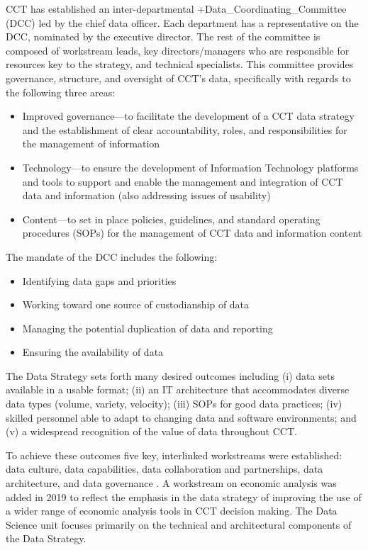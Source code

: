 \documentclass[
]{WileySix}
\providecommand{\tightlist}{%
  \setlength{\itemsep}{0pt}\setlength{\parskip}{0pt}}
\begin{document}
CCT has established an inter-departmental +Data\_Coordinating\_Committee\textbar{} (DCC) led by the chief data officer. Each department has a representative on the DCC, nominated by the executive director. The rest of the committee is composed of workstream leads, key directors/managers who are responsible for resources key to the strategy, and technical specialists. This committee provides governance, structure, and oversight of CCT's data, specifically with regards to the following three areas:

\begin{itemize}
\tightlist
\item
  Improved governance---to facilitate the development of a CCT data strategy and the establishment of clear accountability, roles, and responsibilities for the management of information
\item
  Technology---to ensure the development of Information Technology platforms and tools to support and enable the management and integration of CCT data and information (also addressing issues of usability)
\item
  Content---to set in place policies, guidelines, and standard operating procedures (SOPs) for the management of CCT data and information content \citep{cityofcapetown2018}
\end{itemize}

The mandate of the DCC includes the following:

\begin{itemize}
\tightlist
\item
  Identifying data gaps and priorities
\item
  Working toward one source of custodianship of data
\item
  Managing the potential duplication of data and reporting
\item
  Ensuring the availability of data
\end{itemize}

The Data Strategy sets forth many desired outcomes including (i) data sets available in a usable format; (ii) an IT architecture that accommodates diverse data types (volume, variety, velocity); (iii) SOPs for good data practices; (iv) skilled personnel able to adapt to changing data and software environments; and (v) a widespread recognition of the value of data throughout CCT.

To achieve these outcomes five key, interlinked workstreams were established: data culture, data capabilities, data collaboration and partnerships, data architecture, and data governance \citep{cityofcapetown2018}. A workstream on economic analysis was added in 2019 to reflect the emphasis in the data strategy of improving the use of a wider range of economic analysis tools in CCT decision making. The Data Science unit focuses primarily on the technical and architectural components of the Data Strategy.
\end{document}
